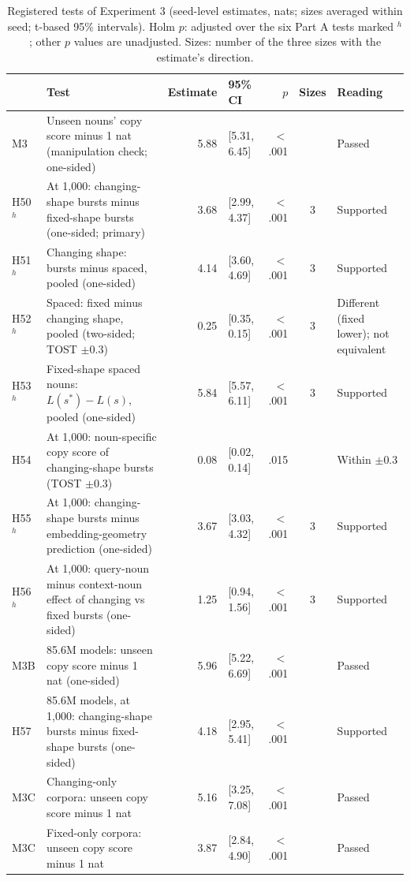 \begin{table}[!htbp]
\centering\small
\caption{Registered tests of Experiment 3 (seed-level estimates, nats; sizes averaged within seed; t-based 95\% intervals). Holm $p$: adjusted over the six Part A tests marked $^h$; other $p$ values are unadjusted. Sizes: number of the three sizes with the estimate's direction.}
\label{tab:O1}
\begin{tabular}{@{}l>{\raggedright\arraybackslash}p{}rlrc>{\raggedright\arraybackslash}p{}@{}}
\toprule
& Test & Estimate & 95\% CI & $p$ & Sizes & Reading \\
\midrule
M3 & Unseen nouns' copy score minus 1 nat (manipulation check; one-sided) & 5.88 & [5.31, 6.45] & $<$.001 &  & Passed \\
H50$^h$ & At 1,000: changing-shape bursts minus fixed-shape bursts (one-sided; primary) & 3.68 & [2.99, 4.37] & $<$.001 & 3 & Supported \\
H51$^h$ & Changing shape: bursts minus spaced, pooled (one-sided) & 4.14 & [3.60, 4.69] & $<$.001 & 3 & Supported \\
H52$^h$ & Spaced: fixed minus changing shape, pooled (two-sided; TOST $\pm$0.3) & \textminus{}0.25 & [\textminus{}0.35, \textminus{}0.15] & $<$.001 & 3 & Different (fixed lower); not equivalent \\
H53$^h$ & Fixed-shape spaced nouns: $L(s^*) - L(s)$, pooled (one-sided) & 5.84 & [5.57, 6.11] & $<$.001 & 3 & Supported \\
H54 & At 1,000: noun-specific copy score of changing-shape bursts (TOST $\pm$0.3) & 0.08 & [0.02, 0.14] & .015 &  & Within $\pm$0.3 \\
H55$^h$ & At 1,000: changing-shape bursts minus embedding-geometry prediction (one-sided) & 3.67 & [3.03, 4.32] & $<$.001 & 3 & Supported \\
H56$^h$ & At 1,000: query-noun minus context-noun effect of changing vs fixed bursts (one-sided) & 1.25 & [0.94, 1.56] & $<$.001 & 3 & Supported \\
M3B & 85.6M models: unseen copy score minus 1 nat (one-sided) & 5.96 & [5.22, 6.69] & $<$.001 &  & Passed \\
H57 & 85.6M models, at 1,000: changing-shape bursts minus fixed-shape bursts (one-sided) & 4.18 & [2.95, 5.41] & $<$.001 &  & Supported \\
M3C & Changing-only corpora: unseen copy score minus 1 nat & 5.16 & [3.25, 7.08] & $<$.001 &  & Passed \\
M3C & Fixed-only corpora: unseen copy score minus 1 nat & 3.87 & [2.84, 4.90] & $<$.001 &  & Passed \\

\end{tabular}
\end{table}
